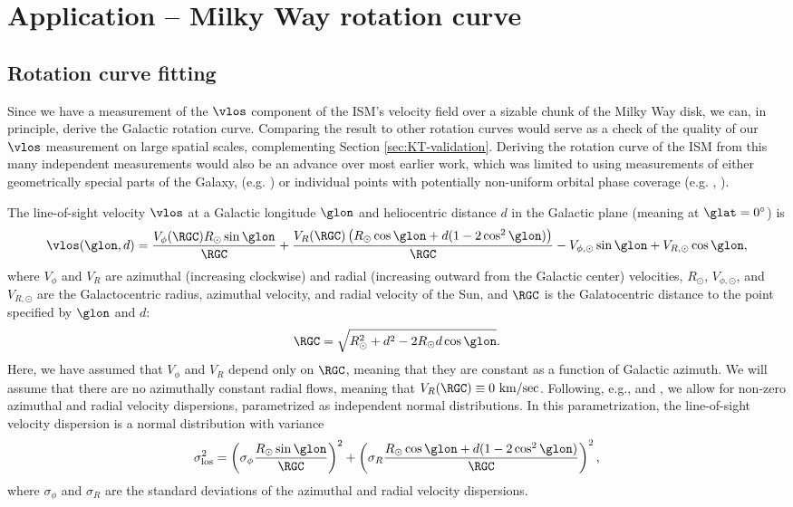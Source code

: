\section{Application -- Milky Way rotation curve}
\label{sec:rotation_curve}

\subsection{Rotation curve fitting}
Since we have a measurement of the $\vlos$ component of the ISM's velocity field over a sizable chunk of the Milky Way disk, we can, in principle, derive the Galactic rotation curve.
Comparing the result to other rotation curves would serve as a check of the quality of our $\vlos$ measurement on large spatial scales, complementing Section \ref{sec:KT-validation}.
Deriving the rotation curve of the ISM from this many independent measurements would also be an advance over most earlier work, which was limited to using measurements of either geometrically special parts of the Galaxy, (e.g. \Clemens) or individual points with potentially non-uniform orbital phase coverage (e.g. \citealt{Reid:2009jb}, \Reid). 

The line-of-sight velocity $\vlos$ at a Galactic longitude $\glon$ and heliocentric distance $d$ in the Galactic plane (meaning at $\glat=0^\circ$) is 
\begin{equation}
\label{eqn:vlos_mean}
\vlos(\glon, d) = \frac{V_\phi (\RGC) R_\odot \sin\glon}{\RGC} + 
\frac{V_R (\RGC) \left(R_\odot \cos \glon + d (1 - 2 \cos^2 \glon)  \right) }{\RGC} - V_{\phi, \odot} \sin \glon + V_{R, \odot} \cos \glon,
\end{equation}
where $V_\phi$ and $V_R$ are azimuthal (increasing clockwise) and radial (increasing outward from the Galactic center) velocities, $R_\odot$, $V_{\phi, \odot}$, and $V_{R, \odot}$ are the Galactocentric radius, azimuthal velocity, and radial velocity of the Sun, and $\RGC$ is the Galatocentric distance to the point specified by $\glon$ and $d$:
\begin{equation}
\RGC = \sqrt{R^2_\odot + d^2 - 2 R_\odot d \cos \glon}.
\end{equation}
Here, we have assumed that $V_\phi$ and $V_R$ depend only on $\RGC$, meaning that they are constant as a function of Galactic azimuth.
We will assume that there are no azimuthally constant radial flows, meaning that $V_R(\RGC) \equiv 0\text{ km/sec}$.
Following, e.g., \citet{Reid:2009jb} and \citet{Bovy_2009}, we allow for non-zero azimuthal and radial velocity dispersions, parametrized as independent normal distributions. 
In this parametrization, the line-of-sight velocity dispersion is a normal distribution with variance
\begin{equation}
\label{eqn:vlos_var}
\sigma^2_\mathrm{los} = \left(\sigma_\phi \frac{R_\odot \sin \glon}{\RGC} \right)^2 + 
\left(\sigma_R  \frac{R_\odot \cos \glon + d (1 - 2 \cos^2 \glon)}{\RGC} \right)^2,
\end{equation}
where $\sigma_\phi$ and $\sigma_R$ are the standard deviations of the azimuthal and radial velocity dispersions. 

